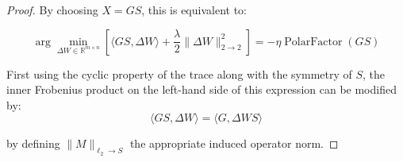 \begin{proof}
    By choosing $X = G S$, this is equivalent to:
    
    \begin{equation}
    \label{eq:polarGS}
        \arg \min_{\Delta W \in \mathbb{R}^{m \times n}} \left[ \langle G S, \Delta W \rangle + \frac{\lambda}{2} \| \Delta W\|_{2 \rightarrow 2}^2 \right] 
        = - \eta \operatorname{PolarFactor}(G S)
    \end{equation}
    
    \noindent First using the cyclic property of the trace along with the symmetry of $S$, the inner Frobenius product on the left-hand side of this expression can be modified by:
    \begin{equation}
    \label{eq:frobprod}
    \langle G S, \Delta W \rangle = \langle G, \Delta W S \rangle
    \end{equation}
    \fi 

\iffalse

    \noindent by defining $\| M \|_{\ell_2 \rightarrow S}$ the appropriate induced operator norm.


\end{proof}
